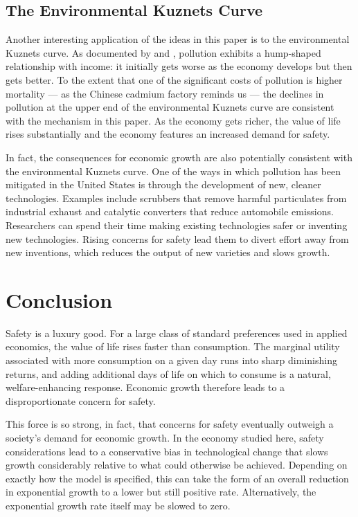 \documentclass[12pt,twoside]{article}
\newcommand{\cn}[1]{\citet*{#1}}
\begin{document}
\subsection{The Environmental Kuznets Curve}

Another interesting application of the ideas in this paper is to the
environmental Kuznets curve. As documented by \cn{SeldenSong94} and
\cn{GrossmanKrueger95}, pollution exhibits a hump-shaped relationship
with income: it initially gets worse as the economy develops but then
gets better.  To the extent that one of the significant costs of
pollution is higher mortality --- as the Chinese cadmium factory reminds
us --- the declines in pollution at the upper end of the environmental
Kuznets curve are consistent with the mechanism in this paper.  As the
economy gets richer, the value of life rises substantially and the
economy features an increased demand for safety.

In fact, the consequences for economic growth are also potentially
consistent with the environmental Kuznets curve. One of the ways in
which pollution has been mitigated in the United States is through the
development of new, cleaner technologies. Examples include scrubbers
that remove harmful particulates from industrial exhaust and catalytic
converters that reduce automobile emissions. Researchers can spend their
time making existing technologies safer or inventing new technologies.
Rising concerns for safety lead them to divert effort away from new
inventions, which reduces the output of new varieties and slows growth.


\section{Conclusion}

Safety is a luxury good. For a large class of standard preferences used
in applied economics, the value of life rises faster than consumption.
The marginal utility associated with more consumption on a given day
runs into sharp diminishing returns, and adding additional days of life
on which to consume is a natural, welfare-enhancing response. Economic
growth therefore leads to a disproportionate concern for safety.

This force is so strong, in fact, that concerns for safety eventually
outweigh a society's demand for economic growth.  In the economy studied
here, safety considerations lead to a conservative bias in technological
change that slows growth considerably relative to what could otherwise
be achieved.  Depending on exactly how the model is specified, this can
take the form of an overall reduction in exponential growth to a lower
but still positive rate.  Alternatively, the exponential growth rate
itself may be slowed to zero.  
\end{document}
